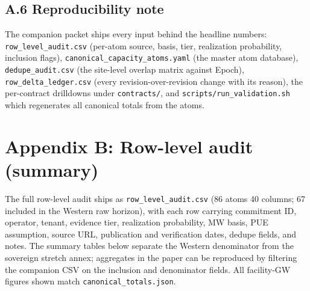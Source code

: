 \documentclass[11pt,a4paper]{article}
\begin{document}
\subsection*{A.6 Reproducibility note}

The companion packet ships every input behind the headline numbers: \texttt{row\_level\_audit.csv} (per-atom source, basis, tier, realization probability, inclusion flags), \texttt{canonical\_capacity\_atoms.yaml} (the master atom database), \texttt{dedupe\_audit.csv} (the site-level overlap matrix against Epoch), \texttt{row\_delta\_ledger.csv} (every revision-over-revision change with its reason), the per-contract drilldowns under \texttt{contracts/}, and \texttt{scripts/run\_validation.sh} which regenerates all canonical totals from the atoms.

\newpage
\section*{Appendix B: Row-level audit (summary)}

\noindent The full row-level audit ships as \texttt{row\_level\_audit.csv} (86 atoms \texttimes{} 40 columns; 67 included in the Western raw horizon), with each row carrying commitment ID, operator, tenant, evidence tier, realization probability, MW basis, PUE assumption, source URL, publication and verification dates, dedupe fields, and notes. The summary tables below separate the Western denominator from the sovereign stretch annex; aggregates in the paper can be reproduced by filtering the companion CSV on the inclusion and denominator fields. All facility-GW figures shown match \texttt{canonical\_totals.json}.
\end{document}
